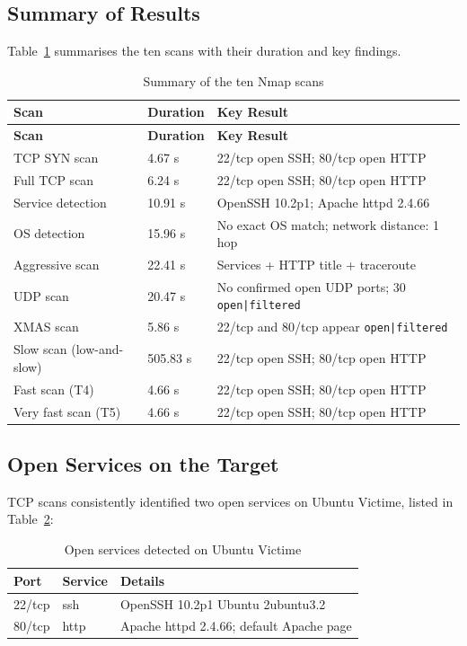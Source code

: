 \subsection{Summary of Results}

Table~\ref{tab:synthese-scans} summarises the ten scans with their duration and key findings.

\begin{longtable}{p{3.2cm}p{2.2cm}p{7.5cm}}
\caption{Summary of the ten Nmap scans} \label{tab:synthese-scans} \\
\toprule
\textbf{Scan} & \textbf{Duration} & \textbf{Key Result} \\
\midrule
\endfirsthead
\toprule
\textbf{Scan} & \textbf{Duration} & \textbf{Key Result} \\
\midrule
\endhead
TCP SYN scan & 4.67 s & 22/tcp open SSH; 80/tcp open HTTP \\
Full TCP scan & 6.24 s & 22/tcp open SSH; 80/tcp open HTTP \\
Service detection & 10.91 s & OpenSSH 10.2p1; Apache httpd 2.4.66 \\
OS detection & 15.96 s & No exact OS match; network distance: 1 hop \\
Aggressive scan & 22.41 s & Services + HTTP title + traceroute \\
UDP scan & 20.47 s & No confirmed open UDP ports; 30 \texttt{open|filtered} \\
XMAS scan & 5.86 s & 22/tcp and 80/tcp appear \texttt{open|filtered} \\
Slow scan (low-and-slow) & 505.83 s & 22/tcp open SSH; 80/tcp open HTTP \\
Fast scan (T4) & 4.66 s & 22/tcp open SSH; 80/tcp open HTTP \\
Very fast scan (T5) & 4.66 s & 22/tcp open SSH; 80/tcp open HTTP \\
\bottomrule
\end{longtable}

\subsection{Open Services on the Target}

TCP scans consistently identified two open services on Ubuntu Victime, listed in Table~\ref{tab:services}:

\begin{table}[H]
\centering
\caption{Open services detected on Ubuntu Victime}
\label{tab:services}
\begin{tabular}{lll}
\toprule
\textbf{Port} & \textbf{Service} & \textbf{Details} \\
\midrule
22/tcp & ssh & OpenSSH 10.2p1 Ubuntu 2ubuntu3.2 \\
80/tcp & http & Apache httpd 2.4.66; default Apache page \\
\bottomrule
\end{tabular}
\end{table}

